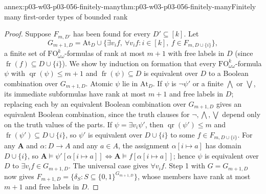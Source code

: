 \begin{annexitem}{annex:p03-w03-p03-056-finitely-many}{thm:p03-w03-p03-056-finitely-many}{Finitely many first-order types of bounded rank}
\begin{proof}
Suppose \(F_{m,D'}\) has been found for every \(D'\subseteq[k]\). Let
\[
 G_{m+1,D}=\mathrm{At}_D\cup\{\exists v_i f,\ \forall v_i f:
   i\in[k],\ f\in F_{m,D\cup\{i\}}\},
\]
a finite set of \(\mathrm{FO}^k_{\omega\omega}\)-formulas of rank at most
\(m+1\) with free labels in \(D\) (since
\(\operatorname{fr}(f)\subseteq D\cup\{i\}\)). We show by induction on
formation that every \(\mathrm{FO}^k_{\omega\omega}\)-formula \(\psi\) with
\(\operatorname{qr}(\psi)\leq m+1\) and \(\operatorname{fr}(\psi)\subseteq D\)
is equivalent over \(D\) to a Boolean combination over \(G_{m+1,D}\).
Atomic \(\psi\) lie in \(\mathrm{At}_D\). If \(\psi\) is \(\neg\psi'\) or a
finite \(\bigwedge\) or \(\bigvee\), its immediate subformulas have rank at
most \(m+1\) and free labels in \(D\); replacing each by an equivalent
Boolean combination over \(G_{m+1,D}\) gives an equivalent Boolean
combination, since the truth clauses for \(\neg,\bigwedge,\bigvee\) depend
only on the truth values of the parts. If \(\psi=\exists v_i\psi'\), then
\(\operatorname{qr}(\psi')\leq m\) and
\(\operatorname{fr}(\psi')\subseteq D\cup\{i\}\), so \(\psi'\) is equivalent
over \(D\cup\{i\}\) to some \(f\in F_{m,D\cup\{i\}}\). For any
\(\mathbf A\) and \(\alpha:D\to A\) and any \(a\in A\), the assignment
\(\alpha[i\mapsto a]\) has domain \(D\cup\{i\}\), so
\(\mathbf A\models\psi'[\alpha[i\mapsto a]]\iff
\mathbf A\models f[\alpha[i\mapsto a]]\); hence \(\psi\) is equivalent over
\(D\) to \(\exists v_if\in G_{m+1,D}\). The universal case gives
\(\forall v_if\). Step 1 with \(G=G_{m+1,D}\) now gives
\(F_{m+1,D}=\{\delta_S:S\subseteq\{0,1\}^{G_{m+1,D}}\}\), whose members have
rank at most \(m+1\) and free labels in \(D\).
\end{proof}
\end{annexitem}

